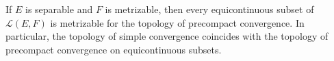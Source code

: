 If $E$ is separable and $F$ is metrizable, then every equicontinuous subset of $\mathcal{L}(E, F)$ is metrizable for the topology of precompact convergence. In particular, the topology of simple convergence coincides with the topology of precompact convergence on equicontinuous subsets.

